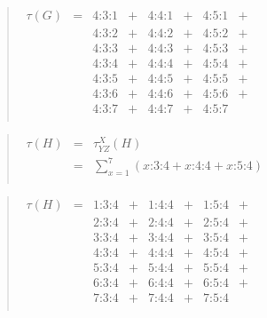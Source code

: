 \documentclass[12pt]{article}
\begin{document}
\begin{quote}$\begin{array}{lccccccc}
\tau(G) & = & 4\mbox{:}3\mbox{:}1 & + & 4\mbox{:}4\mbox{:}1 & + & 4\mbox{:}5\mbox{:}1 & + \\
        &   & 4\mbox{:}3\mbox{:}2 & + & 4\mbox{:}4\mbox{:}2 & + & 4\mbox{:}5\mbox{:}2 & + \\
        &   & 4\mbox{:}3\mbox{:}3 & + & 4\mbox{:}4\mbox{:}3 & + & 4\mbox{:}5\mbox{:}3 & + \\
        &   & 4\mbox{:}3\mbox{:}4 & + & 4\mbox{:}4\mbox{:}4 & + & 4\mbox{:}5\mbox{:}4 & + \\
        &   & 4\mbox{:}3\mbox{:}5 & + & 4\mbox{:}4\mbox{:}5 & + & 4\mbox{:}5\mbox{:}5 & + \\
        &   & 4\mbox{:}3\mbox{:}6 & + & 4\mbox{:}4\mbox{:}6 & + & 4\mbox{:}5\mbox{:}6 & + \\
        &   & 4\mbox{:}3\mbox{:}7 & + & 4\mbox{:}4\mbox{:}7 & + & 4\mbox{:}5\mbox{:}7 &   \\
\end{array}$\end{quote}

\begin{quote}$\begin{array}{lcc}
\tau(H) & = & \tau_{YZ}^X(H) \\
        & = & \sum_{x=1}^7 (x\mbox{:}3\mbox{:}4 + x\mbox{:}4\mbox{:}4 + x\mbox{:}5\mbox{:}4) \\
\end{array}$\end{quote}

\begin{quote}$\begin{array}{lccccccc}
\tau(H) & = & 1\mbox{:}3\mbox{:}4 & + & 1\mbox{:}4\mbox{:}4 & + & 1\mbox{:}5\mbox{:}4 & + \\
        &   & 2\mbox{:}3\mbox{:}4 & + & 2\mbox{:}4\mbox{:}4 & + & 2\mbox{:}5\mbox{:}4 & + \\
        &   & 3\mbox{:}3\mbox{:}4 & + & 3\mbox{:}4\mbox{:}4 & + & 3\mbox{:}5\mbox{:}4 & + \\
        &   & 4\mbox{:}3\mbox{:}4 & + & 4\mbox{:}4\mbox{:}4 & + & 4\mbox{:}5\mbox{:}4 & + \\
        &   & 5\mbox{:}3\mbox{:}4 & + & 5\mbox{:}4\mbox{:}4 & + & 5\mbox{:}5\mbox{:}4 & + \\
        &   & 6\mbox{:}3\mbox{:}4 & + & 6\mbox{:}4\mbox{:}4 & + & 6\mbox{:}5\mbox{:}4 & + \\
        &   & 7\mbox{:}3\mbox{:}4 & + & 7\mbox{:}4\mbox{:}4 & + & 7\mbox{:}5\mbox{:}4 &   \\
\end{array}$\end{quote}
\end{document}
